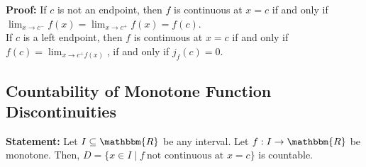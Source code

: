 \documentclass[10pt]{extarticle}
\newcommand{\R}{\mathbbm{R}}
\begin{document}
    \textbf{Proof:} If $c$ is not an endpoint, then $f$ is continuous at $x=c$ if and only if $\lim_{x\rightarrow c^{-}}f(x) = \lim_{x\rightarrow c^{+}} f(x) = f(c) $.\\

    If $c$ is a left endpoint, then $f$ is continuous at $x=c$ if and only if $f(c) = \lim_{x\rightarrow c^{+}f(x)}$, if and only if $j_f(c) = 0$.
  \subsection{Countability of Monotone Function Discontinuities}%
  \textbf{Statement:} Let $I\subseteq \R$ be any interval. Let $f: I\rightarrow \R$ be monotone. Then, $D = \{x\in I\mid f~\text{not continuous at }x=c\}$ is countable.\\
\end{document}

